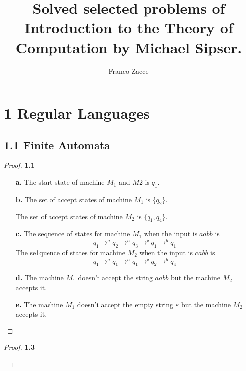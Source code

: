\documentclass[11pt]{article}
\title{\textbf{Solved selected problems of Introduction to the Theory of Computation by Michael Sipser.}}
\author{Franco Zacco}
\date{}
\theoremstyle{definition}
\begin{document}
\maketitle
\thispagestyle{empty}

\section*{1 Regular Languages}
\subsection*{1.1 Finite Automata}

\begin{proof}{\textbf{1.1}}
    \begin{itemize}
        \item [\textbf{a.}] The start state of machine $M_1$ and $M2$ is $q_1$.
        \item [\textbf{b.}]
        The set of accept states of machine $M_1$ is $\{q_2\}$.
       
        The set of accept states of machine $M_2$ is $\{q_1, q_4\}$.
        \item [\textbf{c.}]
        The sequence of states for machine $M_1$ when the input is $aabb$ is
        $$q_1 \to^a q_2 \to^a q_3 \to^b q_1 \to^b q_1$$
        The se1quence of states for machine $M_2$ when the input is $aabb$ is
        $$q_1 \to^a q_1 \to^a q_1 \to^b q_2 \to^b q_4$$

        \item [\textbf{d.}]
        The machine $M_1$ doesn't accept the string $aabb$ but the machine
        $M_2$ accepts it.

        \item [\textbf{e.}]
        The machine $M_1$ doesn't accept the empty string $\varepsilon$
        but the machine $M_2$ accepts it.
    \end{itemize}
\end{proof}
\cleardoublepage
\begin{proof}{\textbf{1.3}}
    \begin{figure}[ht]
        \centering %
    \end{figure}
\end{proof}
\end{document}

